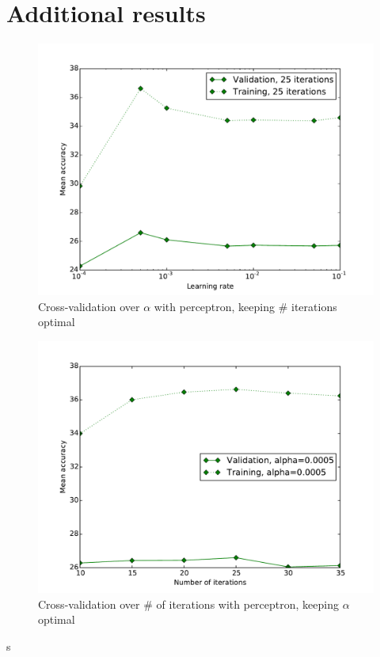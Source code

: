\documentclass{acm_proc_article-sp}
\begin{document}
\section{Additional results}
\label{sec:additional-results}

\begin{figure}[h!]
	\centering
	\includegraphics[width=\linewidth]{perceptron_learningrate}
  	\caption{Cross-validation over $\alpha$ with perceptron, keeping \# iterations optimal}
  	\label{fig:perc-learningrate}
\end{figure}
\begin{figure}[h!]
	\centering
	\includegraphics[width=\linewidth]{perceptron_iterations}
  	\caption{Cross-validation over \# of iterations with perceptron, keeping $\alpha$ optimal}
  	\label{fig:perc-iterations}
\end{figure}s
\end{document}
